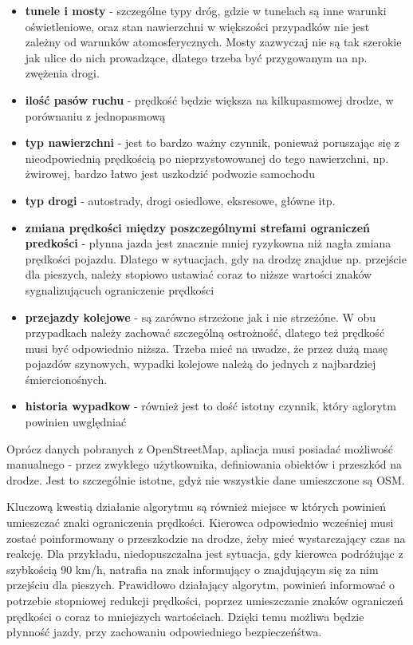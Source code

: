 \begin{itemize}
\item \textbf{tunele i mosty} - szczególne typy dróg, gdzie w tunelach są inne warunki oświetleniowe, oraz stan nawierzchni w większości przypadków nie jest zależny od warunków atomosferycznych. Mosty zazwyczaj nie są tak szerokie jak ulice do nich prowadzące, dlatego trzeba być przygowanym na np. zwężenia drogi.
\item \textbf{ilość pasów ruchu} - prędkość będzie większa na kilkupasmowej drodze, w porównaniu z jednopasmową
\item \textbf{typ nawierzchni} - jest to bardzo ważny czynnik, ponieważ poruszając się z nieodpowiednią prędkością po nieprzystowowanej do tego nawierzchni, np. żwirowej, bardzo łatwo jest uszkodzić podwozie samochodu
\item \textbf{typ drogi} - autostrady, drogi osiedlowe, eksresowe, główne itp.
\item \textbf{zmiana prędkości między poszczególnymi strefami ograniczeń predkości} - płynna jazda jest znacznie mniej ryzykowna niż nagła zmiana prędkości pojazdu. Dlatego w sytuacjach, gdy na drodzę znajdue np. przejście dla pieszych, należy stopiowo ustawiać coraz to niższe wartości znaków sygnalizującuch ograniczenie prędkości
\item \textbf{przejazdy kolejowe} - są zarówno strzeżone jak i nie strzeżóne. W obu przypadkach należy zachować szczególną ostrożność, dlatego też prędkość musi być odpowiednio niższa. Trzeba mieć na uwadze, że przez dużą masę pojazdów szynowych, wypadki kolejowe należą do jednych z najbardziej śmiercionośnych.
\item \textbf{historia wypadkow} - również jest to dość istotny czynnik, który aglorytm powinien uwględniać
\end{itemize}

Oprócz danych pobranych z OpenStreetMap, apliacja musi posiadać możliwość manualnego - przez zwykłego użytkownika, definiowania obiektów i przeszkód na drodze. Jest to szczególnie istotne, gdyż nie wszystkie dane umieszczone są OSM. 


Kluczową kwestią działanie algorytmu są również miejsce w których powinień umieszczać znaki ograniczenia prędkości. Kierowca odpowiednio wcześniej musi zostać poinformowany o przeszkodzie na drodze, żeby mieć wystarczający czas na reakcję. Dla przykładu, niedopuszczalna jest sytuacja, gdy kierowca podróżując z szybkością 90 km/h, natrafia na znak informujący o znajdującym się za nim przejściu dla pieszych. Prawidłowo działający algorytm, powinień informować o potrzebie stopniowej redukcji prędkości, poprzez umieszczanie znaków ograniczeń prędkości o coraz to mniejszych wartościach. Dzięki temu możliwa będzie płynność jazdy, przy zachowaniu odpowiedniego bezpieczeńśtwa.


